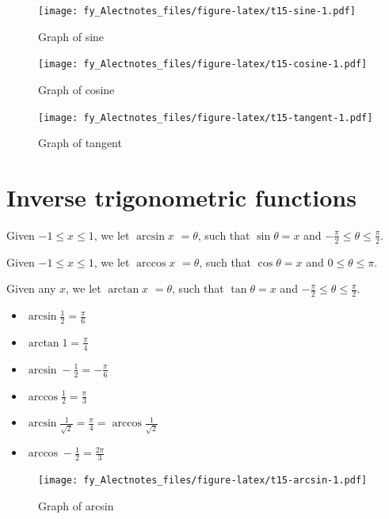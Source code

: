 \documentclass[
  12pt,
  oneside]{book}
\providecommand{\tightlist}{%
  \setlength{\itemsep}{0pt}\setlength{\parskip}{0pt}}
\theoremstyle{definition}
\theoremstyle{definition}
\theoremstyle{definition}
\theoremstyle{definition}
\theoremstyle{remark}
\begin{document}
\begin{figure}
\centering
\texttt{[image: fy\_Alectnotes\_files/figure-latex/t15-sine-1.pdf]}
\caption{\label{fig:t15-sine}Graph of sine}
\end{figure}

\begin{figure}
\centering
\texttt{[image: fy\_Alectnotes\_files/figure-latex/t15-cosine-1.pdf]}
\caption{\label{fig:t15-cosine}Graph of cosine}
\end{figure}

\begin{figure}
\centering
\texttt{[image: fy\_Alectnotes\_files/figure-latex/t15-tangent-1.pdf]}
\caption{\label{fig:t15-tangent}Graph of tangent}
\end{figure}

\hypertarget{inverse-trigonometric-functions}{%
\section{Inverse trigonometric functions}\label{inverse-trigonometric-functions}}

Given \(-1\leq x\leq 1\), we let \(\arcsin x\) \(= \theta\), such that \(\sin\theta = x\) and \(-\frac\pi2\leq\theta\leq \frac\pi2\).

Given \(-1\leq x\leq 1\), we let \(\arccos x\) \(= \theta\), such that \(\cos\theta = x\) and \(0\leq\theta\leq \pi\).

Given any \(x\), we let \(\arctan x\) \(= \theta\), such that \(\tan\theta=x\) and \(-\frac\pi2\leq\theta\leq\frac\pi2\).

\begin{itemize}
\tightlist
\item
  \(\arcsin\frac12=\frac{\pi}6\)
\item
  \(\arctan 1 = \frac{\pi}{4}\)
\item
  \(\arcsin -\frac12=-\frac{\pi}6\)
\item
  \(\arccos\frac12 = \frac{\pi}3\)
\item
  \(\arcsin\frac{1}{\sqrt{2}} = \frac{\pi}{4} = \arccos\frac{1}{\sqrt{2}}\)
\item
  \(\arccos -\frac12= \frac{2\pi}{3}\)
\end{itemize}

\begin{figure}
\centering
\texttt{[image: fy\_Alectnotes\_files/figure-latex/t15-arcsin-1.pdf]}
\caption{\label{fig:t15-arcsin}Graph of arcsin}
\end{figure}
\end{document}
